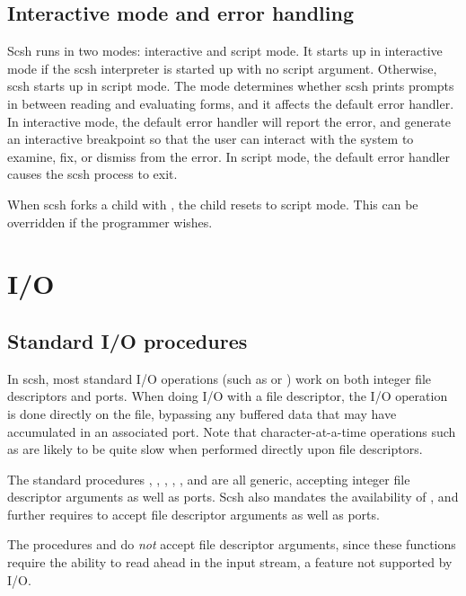 \subsection{Interactive mode and error handling}
Scsh runs in two modes: interactive and script mode. It starts up in
interactive mode if the scsh interpreter is started up with no script
argument. Otherwise, scsh starts up in script mode.  The mode determines
whether scsh prints prompts in between reading and evaluating forms, and it
affects the default error handler.  In interactive mode, the default error
handler will report the error, and generate an interactive breakpoint so that
the user can interact with the system to examine, fix, or dismiss from the
error. In script mode, the default error handler causes the scsh process to
exit.

When scsh forks a child with , the child resets to script mode.
This can be overridden if the programmer wishes.

\section{I/O}

\subsection{Standard {\RnRS} I/O procedures}
In scsh, most standard {\RnRS} I/O operations (such as  or
) work on both integer file descriptors and {\Scheme} ports.
When doing I/O with a file descriptor, the I/O operation is done
directly on the file, bypassing any buffered data that may have
accumulated in an associated port.
Note that character-at-a-time operations such as 
are likely to be quite slow when performed directly upon file
descriptors.

The standard {\RnRS} procedures , , ,
, ,
and  are all generic, accepting integer file descriptor
arguments as well as ports.
Scsh also mandates the availability of , and further requires
 to accept file descriptor arguments as well as ports.

The procedures  and  do \emph{not} accept
file descriptor arguments, since these functions require the ability to
read ahead in the input stream, a feature not supported by {\Unix} I/O.

